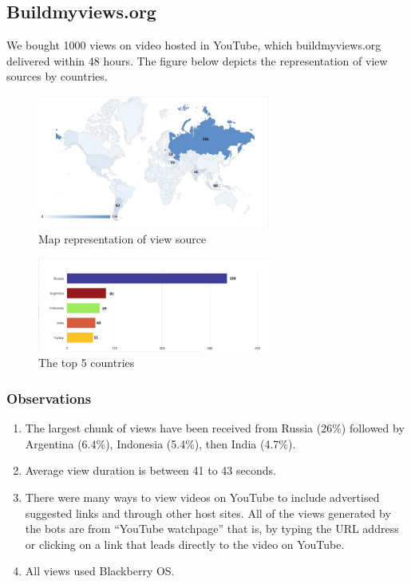 \documentclass[conference]{IEEEtran}
\begin{document}
\subsection{Buildmyviews.org}
We bought 1000 views on video hosted in YouTube, which buildmyviews.org delivered within 48 hours. The figure below depicts the representation of view sources by countries.

\begin{figure}
  \centering
  \includegraphics[width=3.0in]{fig5a}
  \caption{Map representation of view source}
\end{figure}

\begin{figure}
  \centering
  \includegraphics[width=3.0in]{fig5b}
  \caption{The top 5 countries}
\end{figure}

\subsubsection*{Observations}

\begin{enumerate}
  \item The largest chunk of views have been received from Russia (26\%) followed by Argentina (6.4\%), Indonesia (5.4\%), then India (4.7\%).
  \item Average view duration is between 41 to 43 seconds.
  \item There were many ways to view videos on YouTube to include advertised suggested links and through other host sites. All of the views generated by the bots are from ``YouTube watchpage'' that is, by typing the URL address or clicking on a link that leads directly to the video on YouTube.
  \item All views used Blackberry OS.
\end{enumerate}
\end{document}
